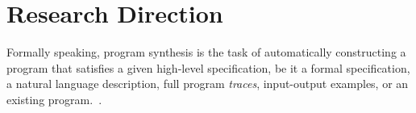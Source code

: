 \documentclass{article} %
\begin{document}
\section{Research Direction} %









Formally speaking, program synthesis is the task of automatically constructing a program
that satisfies a given high-level specification,
be it a formal specification, a natural language description,
full program \emph{traces}, input-output examples,
or an existing program.~\citep{gulwani2017program}.
\end{document}

